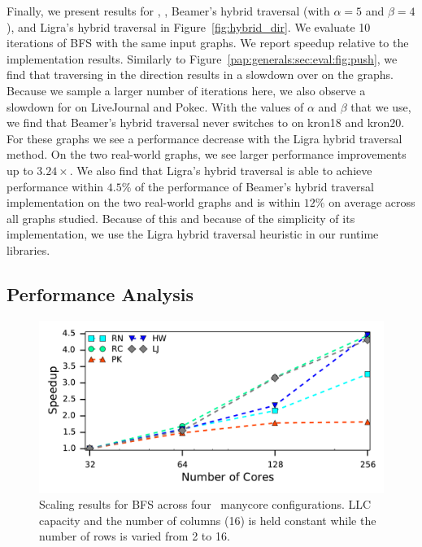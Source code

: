 \hybridresults
Finally, we present results for \push, \pull, Beamer's hybrid traversal (with $\alpha=5$ and $\beta=4$), and Ligra's hybrid traversal in Figure~\ref{fig:hybrid_dir}.
We evaluate 10 iterations of BFS with the same input graphs. 
We report speedup relative to the \push implementation results.
Similarly to Figure~\ref{pap:generals:sec:eval:fig:push}, we find that traversing in the \pull direction results in a slowdown over \push on the \kron graphs. 
Because we sample a larger number of iterations here, we also observe a slowdown for \pull on LiveJournal and Pokec. 
With the values of $\alpha$ and $\beta$ that we use, we find that Beamer's hybrid traversal never switches to \pull on kron18 and kron20. 
For these graphs we see a performance decrease with the Ligra hybrid traversal method.
On the two real-world graphs, we see larger performance improvements up to $3.24\times$.
We also find that Ligra's hybrid traversal is able to achieve performance within $4.5\%$ of the performance of Beamer's hybrid traversal implementation on the two real-world graphs and is within $12\%$ on average across all graphs studied.
Because of this and because of the simplicity of its implementation, we use the Ligra hybrid traversal heuristic in our runtime libraries.
 
\subsection{Performance Analysis}

\begin{figure}[h]
    \centering
    \includegraphics[scale = 0.6]{graphit-figures/hb-scaling-speedup.pdf}
    \caption{Scaling results for BFS across four \hb~manycore configurations. LLC capacity and the number of columns (16) is held constant while the number of rows is varied from 2 to 16.} 
    \label{pap:generals:sec:eval:fig:scaling}
\end{figure}

